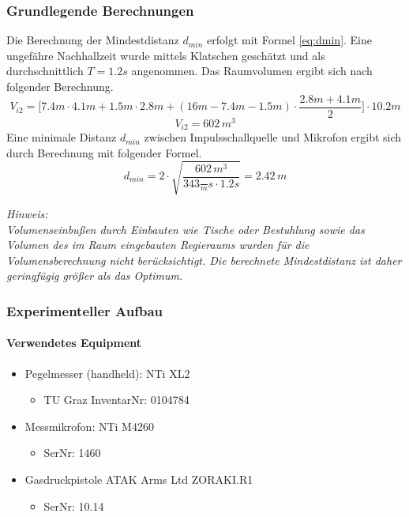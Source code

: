 \documentclass[11pt]{report}
\begin{document}
\subsubsection{Grundlegende Berechnungen}
Die Berechnung der Mindestdistanz $d_{min}$ erfolgt mit Formel \ref{eq:dmin}. Eine ungef\"ahre Nachhallzeit wurde mittels Klatschen gesch\"atzt und als durchschnittlich $T=1.2s$ angenommen. Das Raumvolumen ergibt sich nach folgender Berechnung.
\begin{equation}
V_{i2}=\Big[7.4m\cdot4.1m+1.5m\cdot2.8m+(16m-7.4m-1.5m)\cdot\frac{2.8m+4.1m}{2}\Big]\cdot10.2m
\end{equation}
\begin{equation}
V_{i2}= 602\,m^{3}
\end{equation}
Eine minimale Distanz $d_{min}$ zwischen Impulsschallquelle und Mikrofon ergibt sich durch Berechnung mit folgender Formel.
\begin{equation}
d_{min}=2\cdot\sqrt{\frac{602\,m^{3}}{343\frac\,{m}{s}\cdot 1.2s}}=2.42\,m
\end{equation}
\begin{leftbar}
\textit{ Hinweis:\\
Volumenseinbu\ss en durch Einbauten wie Tische oder Bestuhlung sowie das Volumen des im Raum eingebauten Regieraums wurden f\"ur die Volumensberechnung nicht ber\"ucksichtigt. Die berechnete Mindestdistanz ist daher geringf\"ugig gr\"o\ss er als das Optimum.}
\end{leftbar}
\subsubsection{Experimenteller Aufbau}
\paragraph{Verwendetes Equipment}
\begin{itemize}
\item Pegelmesser (handheld): NTi XL2
\begin{itemize}
\item TU Graz InventarNr: 0104784
\end{itemize}
\item Messmikrofon: NTi M4260
\begin{itemize}
\item SerNr: 1460
\end{itemize}
\item Gasdruckpistole ATAK Arms Ltd ZORAKI.R1
\begin{itemize}
\item SerNr: 10.14
\end{itemize}
\end{itemize}
\end{document}
